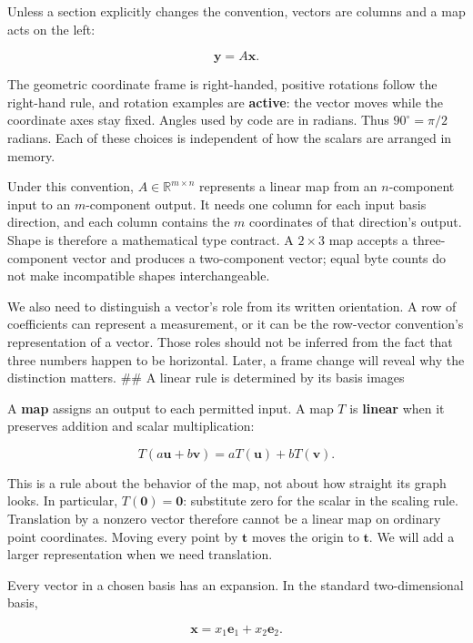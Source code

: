 \hypertarget{01-foundations-i-ch018-the-convention-contract-for-this-volume}{}

Unless a section explicitly changes the convention, vectors are columns and a map acts on the left:

\[
\mathbf y=A\mathbf x.
\]

The geometric coordinate frame is right-handed, positive rotations follow the right-hand rule, and rotation examples are \textbf{active}: the vector moves while the coordinate axes stay fixed. Angles used by code are in radians. Thus \(90^\circ=\pi/2\) radians. Each of these choices is independent of how the scalars are arranged in memory.

Under this convention, \(A\in\mathbb R^{m\times n}\) represents a linear map from an \(n\)-component input to an \(m\)-component output. It needs one column for each input basis direction, and each column contains the \(m\) coordinates of that direction's output. Shape is therefore a mathematical type contract. A \(2\times3\) map accepts a three-component vector and produces a two-component vector; equal byte counts do not make incompatible shapes interchangeable.

We also need to distinguish a vector's role from its written orientation. A row of coefficients can represent a measurement, or it can be the row-vector convention's representation of a vector. Those roles should not be inferred from the fact that three numbers happen to be horizontal. Later, a frame change will reveal why the distinction matters. \#\# A linear rule is determined by its basis images

A \textbf{map} assigns an output to each permitted input. A map \(T\) is \textbf{linear} when it preserves addition and scalar multiplication:

\[
T(a\mathbf u+b\mathbf v)=aT(\mathbf u)+bT(\mathbf v).
\]

This is a rule about the behavior of the map, not about how straight its graph looks. In particular, \(T(\mathbf0)=\mathbf0\): substitute zero for the scalar in the scaling rule. Translation by a nonzero vector therefore cannot be a linear map on ordinary point coordinates. Moving every point by \(\mathbf t\) moves the origin to \(\mathbf t\). We will add a larger representation when we need translation.

Every vector in a chosen basis has an expansion. In the standard two-dimensional basis,

\[
\mathbf x=x_1\mathbf e_1+x_2\mathbf e_2.
\]

